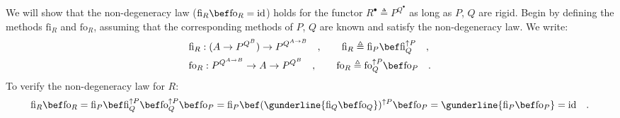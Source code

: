 We will show that the non-degeneracy law ($\text{fi}_{R}\bef\text{fo}_{R}=\text{id}$)
holds for the functor $R^{\bullet}\triangleq P^{Q^{\bullet}}$ as
long as $P$, $Q$ are rigid. Begin by defining the methods $\text{fi}_{R}$
and $\text{fo}_{R}$, assuming that the corresponding methods of $P$,
$Q$ are known and satisfy the non-degeneracy law. We write:
\begin{align*}
 & \text{fi}_{R}:(A\rightarrow P^{Q^{B}})\rightarrow P^{Q^{A\rightarrow B}}\quad,\quad\quad\text{fi}_{R}\triangleq\text{fi}_{P}\bef\text{fi}_{Q}^{\uparrow P}\quad,\\
 & \text{fo}_{R}:P^{Q^{A\rightarrow B}}\rightarrow A\rightarrow P^{Q^{B}}\quad,\quad\quad\text{fo}_{R}\triangleq\text{fo}_{Q}^{\uparrow P}\bef\text{fo}_{P}\quad.
\end{align*}
To verify the non-degeneracy law for $R$:
\[
\text{fi}_{R}\bef\text{fo}_{R}=\text{fi}_{P}\bef\text{fi}_{Q}^{\uparrow P}\bef\text{fo}_{Q}^{\uparrow P}\bef\text{fo}_{P}=\text{fi}_{P}\bef(\gunderline{\text{fi}_{Q}\bef\text{fo}_{Q}})^{\uparrow P}\bef\text{fo}_{P}=\gunderline{\text{fi}_{P}\bef\text{fo}_{P}}=\text{id}\quad.
\]
